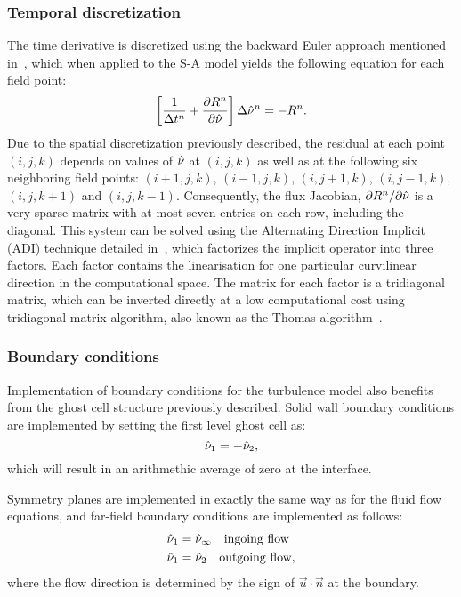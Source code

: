 \subsubsection{Temporal discretization}
%
The time derivative is discretized using the backward Euler approach mentioned in~, which when applied to the S-A model yields the following equation for each field point:
\begin{equation*}
    \left[
        \frac{1}{\Delta t^n} + \pdiff{R^n}{\sa}
    \right] \Delta \sa^n = -R^n.
\end{equation*}
Due to the spatial discretization previously described, the residual at each point $(i,j,k)$ depends on values of $\sa$ at $(i,j,k)$ as well as at the following six neighboring field points: $(i+1,j,k)$, $(i-1,j,k)$, $(i,j+1,k)$, $(i,j-1,k)$, $(i,j,k+1)$ and $(i,j,k-1)$. Consequently, the flux Jacobian, $\partial R^n/\partial \sa$ is a very sparse matrix with at most seven entries on each row, including the diagonal. This system can be solved using the Alternating Direction Implicit (ADI) technique detailed in~\cite{blazek2015computational}, which factorizes the implicit operator into three factors. Each factor contains the linearisation for one particular curvilinear direction in the computational space. The matrix for each factor is a tridiagonal matrix, which can be inverted directly at a low computational cost using tridiagonal matrix algorithm, also known as the Thomas algorithm~\cite{thomas1949elliptic}.
%
\subsubsection{Boundary conditions}
%
Implementation of boundary conditions for the turbulence model also benefits from the ghost cell structure previously described. Solid wall boundary conditions are implemented by setting the first level ghost cell as:
\begin{equation*}
    \sa_1 = -\sa_2,
\end{equation*}
which will result in an arithmethic average of zero at the interface.

Symmetry planes are implemented in exactly the same way as for the fluid flow equations, and far-field boundary conditions are implemented as follows:
\begin{align*}
    \sa_1 &= \sa_\infty \quad\text{ingoing flow}\\
    \sa_1 &= \sa_2 \quad \text{outgoing flow},
\end{align*}
where the flow direction is determined by the sign of $\vec{u}\cdot\vec{n}$ at the boundary.

